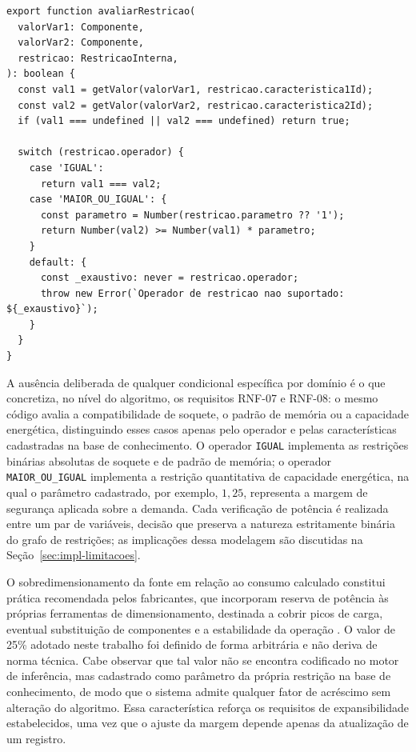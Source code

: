 \begin{lstlisting}[caption={Avaliação genérica de uma restrição},label={lst:avaliar},basicstyle=\ttfamily\small]
export function avaliarRestricao(
  valorVar1: Componente,
  valorVar2: Componente,
  restricao: RestricaoInterna,
): boolean {
  const val1 = getValor(valorVar1, restricao.caracteristica1Id);
  const val2 = getValor(valorVar2, restricao.caracteristica2Id);
  if (val1 === undefined || val2 === undefined) return true;

  switch (restricao.operador) {
    case 'IGUAL':
      return val1 === val2;
    case 'MAIOR_OU_IGUAL': {
      const parametro = Number(restricao.parametro ?? '1');
      return Number(val2) >= Number(val1) * parametro;
    }
    default: {
      const _exaustivo: never = restricao.operador;
      throw new Error(`Operador de restricao nao suportado: ${_exaustivo}`);
    }
  }
}
\end{lstlisting}

A ausência deliberada de qualquer condicional específica por domínio é o que concretiza, no nível do algoritmo, os requisitos RNF-07 e RNF-08: o mesmo código avalia a compatibilidade de soquete, o padrão de memória ou a capacidade energética, distinguindo esses casos apenas pelo operador e pelas características cadastradas na base de conhecimento. O operador \texttt{IGUAL} implementa as restrições binárias absolutas de soquete e de padrão de memória; o operador \texttt{MAIOR\_OU\_IGUAL} implementa a restrição quantitativa de capacidade energética, na qual o parâmetro cadastrado, por exemplo, $1{,}25$, representa a margem de segurança aplicada sobre a demanda. Cada verificação de potência é realizada entre um par de variáveis, decisão que preserva a natureza estritamente binária do grafo de restrições; as implicações dessa modelagem são discutidas na Seção~\ref{sec:impl-limitacoes}.

O sobredimensionamento da fonte em relação ao consumo calculado constitui prática
recomendada pelos fabricantes, que incorporam reserva de potência às próprias ferramentas
de dimensionamento, destinada a cobrir picos de carga, eventual substituição de componentes
e a estabilidade da operação \cite{SEASONIC2026}. O valor de 25\% adotado neste trabalho
foi definido de forma arbitrária e não deriva de norma técnica. Cabe observar que tal valor
não se encontra codificado no motor de inferência, mas cadastrado como parâmetro da própria
restrição na base de conhecimento, de modo que o sistema admite qualquer fator de acréscimo
sem alteração do algoritmo. Essa característica reforça os requisitos de expansibilidade
estabelecidos, uma vez que o ajuste da margem depende apenas da atualização de um registro.

